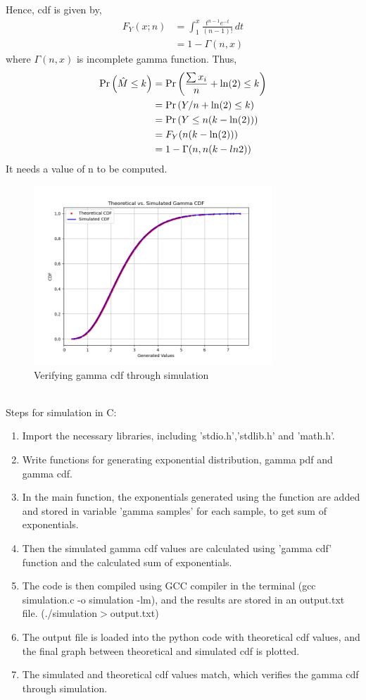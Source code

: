 \documentclass[]{article}
\theoremstyle{remark}
\begin{document}
Hence, cdf is given by,
\begin{align}
F_Y(x;n) &= \int_{1}^{x} \frac{t^{n-1}e^{-t}}{(n-1)!} \,dt \\
&= 1 - \Gamma(n,x)
\end{align}
where $\Gamma(n,x)$ is incomplete gamma function.
Thus,
\begin{align}
\Pr\left(\hat{M} \leq k\right) &= \Pr\left(\frac{\sum x_i}{n} + \ln(2) \leq k\right)\\
&= \Pr\left(Y/n + \ln(2) \leq k\right)\\
&= \Pr\left(Y \leq n(k - \ln(2))\right)\\
&= F_Y(n(k-\ln(2)))\\
&= 1 - \Gamma(n,n(k-ln2))
\end{align}
It needs a value of n to be computed.
\begin{figure}[htbp]
    \centering
    \includegraphics[width=0.8\textwidth]{figs/fig.png} 
    \caption{Verifying gamma cdf through simulation}
    \label{fig:39/2023}
\end{figure}\\
Steps for simulation in C:
\begin{enumerate}
\item Import the necessary libraries, including 'stdio.h','stdlib.h' and 'math.h'.
\item Write functions for generating exponential distribution, gamma pdf and gamma cdf.
\item In the main function, the exponentials generated using the function are added and stored in variable 'gamma samples' for each sample, to get sum of exponentials.
\item Then the simulated gamma cdf values are calculated using 'gamma cdf' function and the calculated sum of exponentials.
\item The code is then compiled using GCC compiler in the terminal (gcc simulation.c -o simulation -lm), and the results are stored in an output.txt file. (./simulation$>$output.txt)
\item The output file is loaded into the python code with theoretical cdf values, and the final graph between theoretical and simulated cdf is plotted.
\item The simulated and theoretical cdf values match, which verifies the gamma cdf through simulation.
\end{enumerate}
\end{document}
